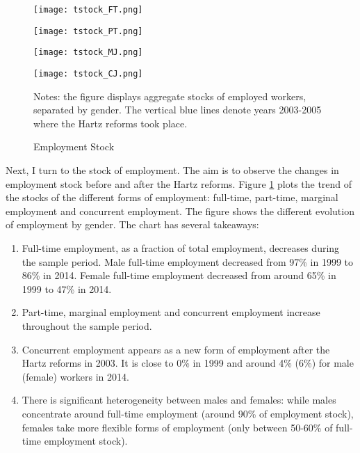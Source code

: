 \documentclass[12pt, a4paper]{article}
\begin{document}
\begin{figure}[!t]
	\begin{minipage}[b]{0.48\textwidth}
		\centering
		\texttt{[image: tstock\_FT.png]}
	\end{minipage}
	\begin{minipage}[b]{0.48\textwidth}
		\centering
		\texttt{[image: tstock\_PT.png]}
	\end{minipage}
	\begin{minipage}[b]{0.48\textwidth}
		\centering
		\texttt{[image: tstock\_MJ.png]}
	\end{minipage}
	\begin{minipage}[b]{0.48\textwidth}
		\centering
		\texttt{[image: tstock\_CJ.png]}
	\end{minipage}
\footnotesize{
\justifying Notes: the figure displays aggregate stocks of employed workers, separated by gender. The vertical blue lines denote years 2003-2005 where the Hartz reforms took place.\par}
\captionsetup{font=small,justification=raggedright}
\caption{Employment Stock}\label{fig:stock}
\end{figure}

Next, I turn to the stock of employment. The aim is to observe the changes in employment stock before and after the Hartz reforms. Figure \ref{fig:stock} plots the trend of the stocks of the different forms of employment: full-time, part-time, marginal employment and concurrent employment. The figure shows the different evolution of employment by gender. The chart has several takeaways:

\begin{enumerate}
\item Full-time employment, as a fraction of total employment, decreases during the sample period. Male full-time employment decreased from 97\% in 1999 to 86\% in 2014. Female full-time employment decreased from around 65\% in 1999 to 47\% in 2014.
\item Part-time, marginal employment and concurrent employment increase throughout the sample period.
\item Concurrent employment appears as a new form of employment after the Hartz reforms in 2003. It is close to 0\% in 1999 and around 4\% (6\%) for male (female) workers in 2014.
\item There is significant heterogeneity between males and females: while males concentrate around full-time employment (around 90\% of employment stock), females take more flexible forms of employment (only between 50-60\% of full-time employment stock).
\end{enumerate}
\end{document}
